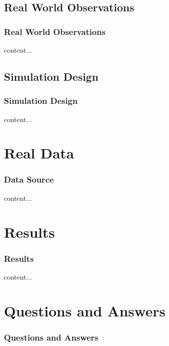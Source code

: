 \documentclass{beamer}
\begin{document}
\subsection{Real World Observations}
\begin{frame}
\frametitle{Real World Observations}
	content...
\end{frame}

\subsection{Simulation Design}
\begin{frame}
\frametitle{Simulation Design}
content...
\end{frame}

\section{Real Data}

\begin{frame}
\frametitle{Data Source}
	content...
\end{frame}

\section{Results}

\begin{frame}
\frametitle{Results}
	content...
\end{frame}

\section{Questions and Answers}

\begin{frame}
\frametitle{Questions and Answers}
\end{frame}
\end{document}
